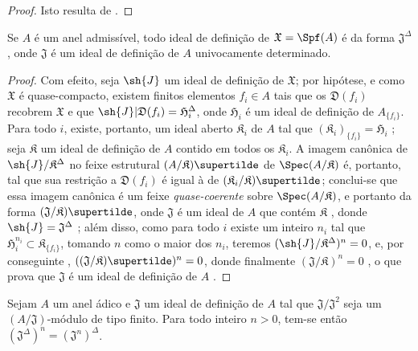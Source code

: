 \documentclass[oneside]{amsart}
\let\EGAOriginalLabel\label
\renewcommand{\label}[1]{\phantomsection\EGAOriginalLabel{#1}}
\begin{document}
\begin{proof}
Isto resulta de .
\end{proof}

\begin{proposition}[10.3.5]
\label{I.10.3.5}
Se $A$ é um anel admissível, todo ideal de definição de $\mathfrak{X}=\Spf(A)$ é da forma $\mathfrak{J}^\Delta$, onde $\mathfrak{J}$ é um ideal de definição de $A$ univocamente determinado.
\end{proposition}

\begin{proof}
Com efeito, seja $\sh{J}$ um ideal de definição de $\mathfrak{X}$; por hipótese, e como $\mathfrak{X}$ é quase-compacto, existem finitos elementos $f_i\in A$ tais que os $\mathfrak{D}(f_i)$ recobrem $\mathfrak{X}$ e que $\sh{J}|\mathfrak{D}(f_i)=\mathfrak{H}_i^\Delta$, onde $\mathfrak{H}_i$ é um ideal de definição de $A_{\{f_i\}}$.
Para todo $i$, existe, portanto, um ideal aberto $\mathfrak{K}_i$ de $A$ tal que $(\mathfrak{K}_i)_{\{f_i\}}=\mathfrak{H}_i$ ; seja $\mathfrak{K}$ um ideal de definição de $A$ contido em todos os $\mathfrak{K}_i$.
A imagem canônica de $\sh{J}/\mathfrak{K}^\Delta$ no feixe estrutural $(A/\mathfrak{K})\supertilde$ de $\Spec(A/\mathfrak{K})$  é, portanto, tal que sua restrição a $\mathfrak{D}(f_i)$ é igual à de $(\mathfrak{K}_i/\mathfrak{K})\supertilde$;
conclui-se que essa imagem canônica é um feixe \emph{quase-coerente} sobre $\Spec(A/\mathfrak{K})$, e portanto da forma $(\mathfrak{J}/\mathfrak{K})\supertilde$, onde $\mathfrak{J}$ é um ideal de $A$ que contém $\mathfrak{K}$ , donde $\sh{J}=\mathfrak{J}^\Delta$ ;
além disso, como para todo $i$ existe um inteiro $n_i$ tal que $\mathfrak{H}_i^{n_i}\subset\mathfrak{K}_{\{f_i\}}$, tomando $n$ como o maior dos $n_i$, teremos $(\sh{J}/\mathfrak{K}^\Delta)^n=0$, e, por conseguinte , $((\mathfrak{J}/\mathfrak{K})\supertilde)^n=0$, donde finalmente $(\mathfrak{J}/\mathfrak{K})^n=0$ , o que prova que $\mathfrak{J}$ é um ideal de definição de $A$ .
\end{proof}

\begin{proposition}[10.3.6]
\label{I.10.3.6}
Sejam $A$ um anel ádico e $\mathfrak{J}$ um ideal de definição de $A$ tal que $\mathfrak{J}/\mathfrak{J}^2$ seja um $(A/\mathfrak{J})$-módulo de tipo finito. Para todo inteiro $n>0$, tem-se então $(\mathfrak{J}^\Delta)^n=(\mathfrak{J}^n)^\Delta$.
\end{proposition}
\end{document}
